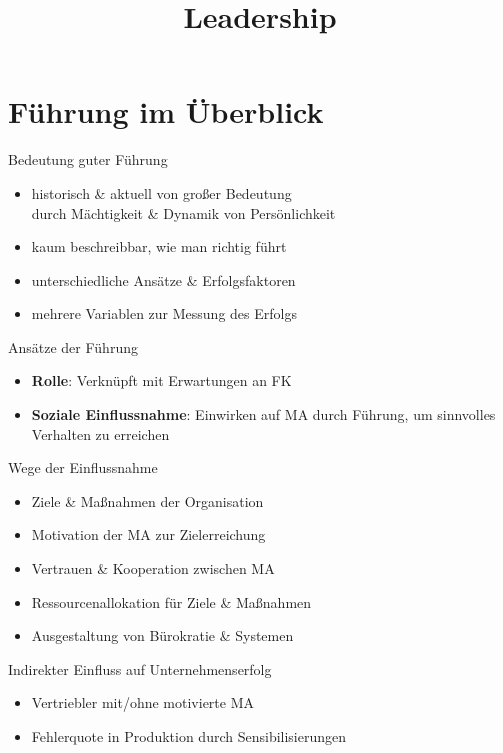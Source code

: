 \documentclass{cheatsheet}
\title{Leadership}
\begin{document}
    \section{Führung im Überblick}
    \begin{sectionbox}{Bedeutung guter Führung}
        \begin{itemize}
            \item historisch \& aktuell von großer Bedeutung\\
            \ra durch Mächtigkeit \& Dynamik von Persönlichkeit
            \item kaum beschreibbar, wie man richtig führt
            \item unterschiedliche Ansätze \& Erfolgsfaktoren
            \item mehrere Variablen zur Messung des Erfolgs
        \end{itemize}
    \end{sectionbox}
    \begin{warningbox}{Ansätze der Führung}
        \begin{itemize}
            \item \textbf{Rolle}: Verknüpft mit Erwartungen an FK
            \item \textbf{Soziale Einflussnahme}: Einwirken auf MA durch Führung, um sinnvolles Verhalten zu erreichen
        \end{itemize}
    \end{warningbox}
    \begin{sectionbox}{Wege der Einflussnahme}
        \begin{itemize}
            \item Ziele \& Maßnahmen der Organisation
            \item Motivation der MA zur Zielerreichung
            \item Vertrauen \& Kooperation zwischen MA
            \item Ressourcenallokation für Ziele \& Maßnahmen
            \item Ausgestaltung von Bürokratie \& Systemen
        \end{itemize}
    \end{sectionbox}
    \begin{hintbox}{Indirekter Einfluss auf Unternehmenserfolg}
        \begin{itemize}
            \item Vertriebler mit/ohne motivierte MA
            \item Fehlerquote in Produktion durch Sensibilisierungen 
        \end{itemize}
    \end{hintbox}
\end{document}
